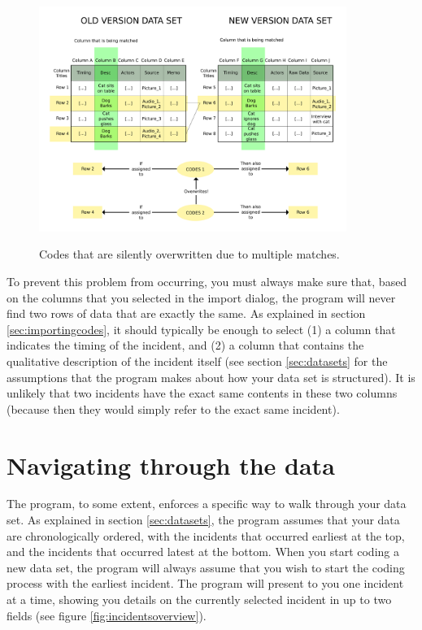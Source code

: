 \documentclass{memoir}
\begin{document}
\begin{figure}[h!]
  \centering
  \caption{Codes that are silently overwritten due to multiple matches.}
  \includegraphics[width=100mm]{Diagram_2.pdf}
  \label{fig:overwritingcodes}
\end{figure}

To prevent this problem from occurring, you must always make sure that, based on the columns that you selected in the import dialog, the program will never find two rows of data that are exactly the same. As explained in section \ref{sec:importingcodes}, it should typically be enough to select (1) a column that indicates the timing of the incident, and (2) a column that contains the qualitative description of the incident itself (see section \ref{sec:datasets} for the assumptions that the program makes about how your data set is structured). It is unlikely that two incidents have the exact same contents in these two columns (because then they would simply refer to the exact same incident).

\section{Navigating through the data}
\label{sec:navigatingdata}

The program, to some extent, enforces a specific way to walk through your data set. As explained in section \ref{sec:datasets}, the program assumes that your data are chronologically ordered, with the incidents that occurred earliest at the top, and the incidents that occurred latest at the bottom. When you start coding a new data set, the program will always assume that you wish to start the coding process with the earliest incident. The program will present to you one incident at a time, showing you details on the currently selected incident in up to two fields (see figure \ref{fig:incidentsoverview}). 
\end{document}
